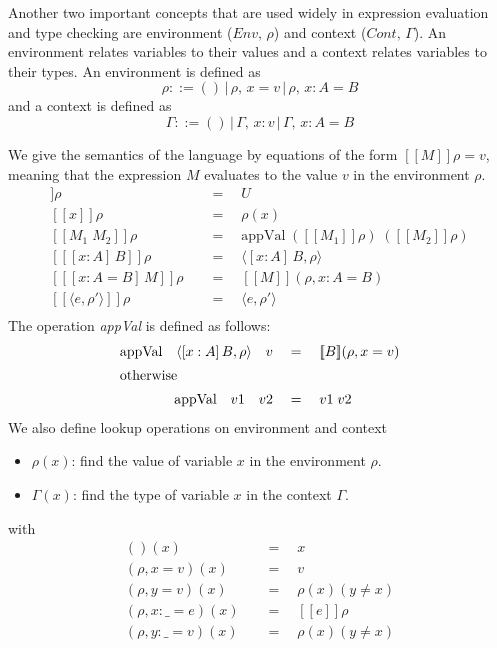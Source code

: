 \documentclass{article}
\theoremstyle{remark}
\begin{document}
Another two important concepts that are used widely in expression evaluation and type checking are environment ($Env,\,\rho$) and context ($Cont,\,\Gamma$). An environment relates variables to their values and a context relates variables to their types. An environment is defined as
\[
\rho ::= ()\,|\,\rho,\,x = v\,|\,\rho,\,x : A = B
\]
and a context is defined as
\[
  \Gamma ::= ()\,|\,\Gamma,\,x : v\,|\,\Gamma,\,x : A = B
\]

We give the semantics of the language by equations of the form $[\![M]\!]\rho = v$, meaning that the expression $M$ evaluates to the value $v$ in the environment $\rho$.
\begin{align*}
  [\![U]\!]\rho \quad &= \quad U \\
  [\![x]\!]\rho \quad &= \quad \rho(x) \\
  [\![M_1 \; M_2]\!]\rho \quad &= \quad \text{appVal} \; ([\![M_1]\!]\rho) \; ([\![M_2]\!]\rho) \\
  [\![[x : A]\,B]\!]\rho \quad &= \quad \langle[x : A]\,B, \rho\rangle \\
  [\![[x : A = B]\,M]\!]\rho \quad &= \quad [\![M]\!](\rho, x : A = B) \\
  [\![\langle e, \rho'\rangle]\!]\rho \quad &= \quad \langle e, \rho' \rangle \\
\end{align*}
The operation \textit{appVal} is defined as follows:
\begin{align*}
  \text{appVal} \quad \langle [x : A]\,B, \rho \rangle \quad v \quad &= \quad [\![B]\!](\rho, x = v) \\
  \intertext{otherwise}
  \text{appVal} \quad v1 \quad v2 \quad &= \quad v1\;v2
\end{align*}
We also define lookup operations on environment and context
\begin{itemize}
\item $\rho(x)$: find the value of variable $x$ in the environment $\rho$.
\item $\Gamma(x)$: find the type of variable $x$ in the context $\Gamma$.
\end{itemize}
with
\begin{align*}
  ()(x) \quad &= \quad x \\
  (\rho, x = v)(x) \quad &= \quad v \\
  (\rho, y = v)(x) \quad &= \quad \rho(x)(y \neq x) \\
  (\rho, x : \_ = e)(x) \quad &= \quad [\![e]\!]\rho \\
  (\rho, y : \_ = v)(x) \quad &= \quad \rho(x)(y \neq x) \\
\end{align*}
\end{document}

